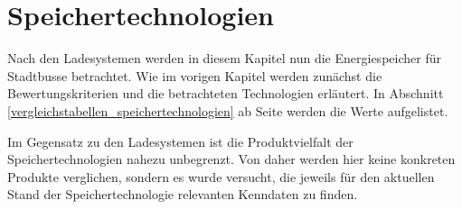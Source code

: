\chapter{Speichertechnologien}

Nach den Ladesystemen werden in diesem Kapitel nun die Energiespeicher für Stadtbusse betrachtet. Wie im vorigen Kapitel werden zunächst die Bewertungskriterien und die betrachteten Technologien erläutert. In Abschnitt \ref{vergleichstabellen_speichertechnologien} ab Seite \pageref{vergleichstabellen_speichertechnologien} werden die Werte aufgelistet.

Im Gegensatz zu den Ladesystemen ist die Produktvielfalt der Speichertechnologien nahezu unbegrenzt. Von daher werden hier keine konkreten Produkte verglichen, sondern es wurde versucht, die jeweils für den aktuellen Stand der Speichertechnologie relevanten Kenndaten zu finden.

